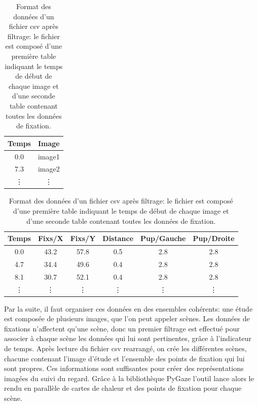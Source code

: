 \documentclass[hidelinks,12pt]{article}
\begin{document}
\bigskip
\begin{table}[htpb]
  \begin{adjustwidth}{0.05\textwidth}{0cm}
    \begin{tabular}{|c||c|}
      \hline
      Temps  & Image  \\
      \hline
      0.0    & image1 \\
      7.3    & image2 \\
      \vdots & \vdots \\
      \hline
    \end{tabular}
    \newline
    \begin{tabular}{|c||c|c|c|c|c|}
      \hline
      Temps  & Fixs/X & Fixs/Y & Distance & Pup/Gauche & Pup/Droite \\
      \hline
      0.0    & 43.2   & 57.8   & 0.5      & 2.8        & 2.8        \\
      4.7    & 34.4   & 49.6   & 0.4      & 2.8        & 2.8        \\
      8.1    & 30.7   & 52.1   & 0.4      & 2.8        & 2.8        \\
      \vdots & \vdots & \vdots & \vdots   & \vdots     & \vdots     \\
      \hline
    \end{tabular}
  \end{adjustwidth}
  \caption{Format des données d'un fichier csv après filtrage: le fichier est
    composé d'une première table indiquant le temps de début de chaque image et
    d'une seconde table contenant toutes les données de fixation.}
  \label{tab:format-csv}
\end{table}

Par la suite, il faut organiser ces données en des ensembles cohérents: une
étude est composée de plusieurs images, que l'on peut appeler scènes. Les
données de fixations n'affectent qu'une scène, donc un premier filtrage est
effectué pour associer à chaque scène les données qui lui sont pertinentes,
grâce à l'indicateur de temps. Après lecture du fichier csv rearrangé, on crée
les différentes scènes, chacune contenant l'image d'étude et l'ensemble des
points de fixation qui lui sont propres. Ces informations sont suffisantes pour
créer des représentations imagées du suivi du regard. Grâce à la bibliothèque
PyGaze l'outil lance alors le rendu en parallèle de cartes de chaleur et des
points de fixation pour chaque scène.
\end{document}
